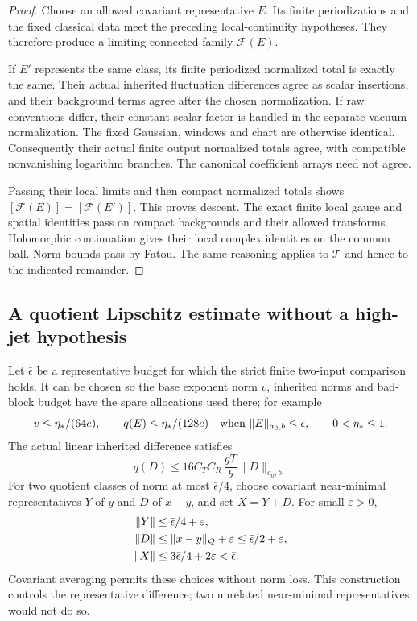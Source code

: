 \documentclass[11pt]{article}
\theoremstyle{remark}
\begin{document}
\begin{proof}
Choose an allowed covariant representative \(E\). Its finite
periodizations and the fixed classical data meet the preceding
local-continuity hypotheses. They therefore produce a limiting
connected family \(\mathcal F(E)\).

If \(E'\) represents the same class, its finite periodized
normalized total is exactly the same. Their actual inherited
fluctuation differences agree as scalar insertions, and their
background terms agree after the chosen normalization.
If raw conventions differ, their constant scalar factor is
handled in the separate vacuum normalization. The fixed
Gaussian, windows and chart are otherwise identical.
Consequently their actual finite output normalized totals
agree, with compatible nonvanishing logarithm branches.
The canonical coefficient arrays need not agree.

Passing their local limits and then compact normalized totals
shows \([\mathcal F(E)]=[\mathcal F(E')]\). This proves descent.
The exact finite local gauge and spatial identities pass on
compact backgrounds and their allowed transforms. Holomorphic
continuation gives their local complex identities on the
common ball. Norm bounds pass by Fatou. The same reasoning
applies to \(\mathcal T\) and hence to the indicated remainder.
\end{proof}

\subsection{A quotient Lipschitz estimate without a high-jet hypothesis}
\label{qll-Lipschitz-section}

Let \(\bar\epsilon\) be a representative budget for which the
strict finite two-input comparison holds. It can be chosen so
the base exponent norm \(v\), inherited norms and bad-block
budget have the spare allocations used there; for example
\begin{equation}
 v\le\eta_*/(64e),\qquad
 q(E)\le\eta_*/(128e)
       \quad\hbox{when }\|E\|_{a_0,b}\le\bar\epsilon,
 \qquad 0<\eta_*\le1.
 \label{qll-comparison-budgets}
\end{equation}
The actual linear inherited difference satisfies
\begin{equation}
 q(D)\le16C_TC_R\,\frac{gT}{b}\|D\|_{a_0,b}.
 \label{qll-increment-bound}
\end{equation}
For two quotient classes of norm at most \(\bar\epsilon/4\),
choose covariant near-minimal representatives \(Y\) of \(y\)
and \(D\) of \(x-y\), and set \(X=Y+D\). For small \(\varepsilon>0\),
\begin{align}
 \|Y\|&\le\bar\epsilon/4+\varepsilon,\notag\\
 \|D\|&\le\|x-y\|_{\mathcal Q}+\varepsilon
                    \le\bar\epsilon/2+\varepsilon,\notag\\
 \|X\|&\le3\bar\epsilon/4+2\varepsilon<\bar\epsilon .
 \label{qll-compatible-representatives}
\end{align}
Covariant averaging permits these choices without norm loss.
This construction controls the representative difference;
two unrelated near-minimal representatives would not do so.
\end{document}
